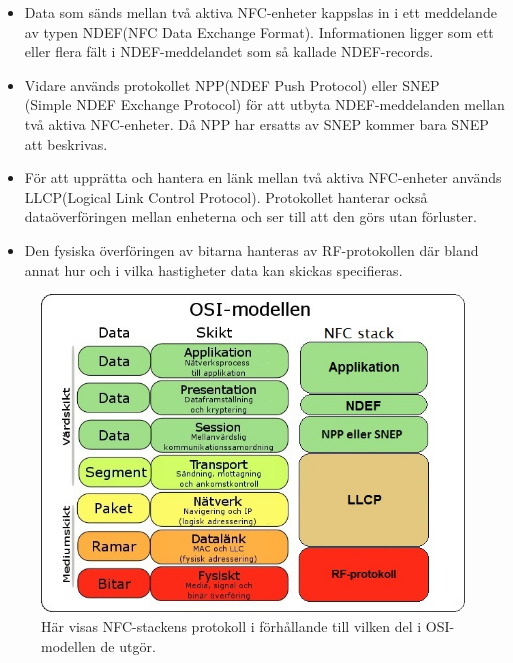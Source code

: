 \documentclass[11pt]{article}
\begin{document}
\begin{itemize}
\item Data som sänds mellan två aktiva NFC-enheter kappslas in i ett meddelande av typen NDEF(NFC Data Exchange Format). Informationen ligger som ett eller flera fält i NDEF-meddelandet som så kallade NDEF-records. 

\item Vidare används protokollet NPP(NDEF Push Protocol) eller SNEP\\(Simple NDEF Exchange Protocol) för att utbyta NDEF-meddelanden mellan två aktiva NFC-enheter. Då NPP har ersatts av SNEP kommer bara SNEP att beskrivas.

\item För att upprätta och hantera en länk mellan två aktiva NFC-enheter används LLCP(Logical Link Control Protocol). Protokollet hanterar också dataöverföringen mellan enheterna och ser till att den görs utan förluster.

\item Den fysiska överföringen av bitarna hanteras av RF-protokollen där bland annat hur och i vilka hastigheter data kan skickas specifieras.

\end{itemize}

\begin{figure}[H]
\centering
\includegraphics[scale=0.7]{NFC_stack.jpg}
\caption{Här visas NFC-stackens protokoll i förhållande till vilken del i OSI-modellen de utgör.}
\label{fig:NFC Stack}
\end{figure}
\end{document}
